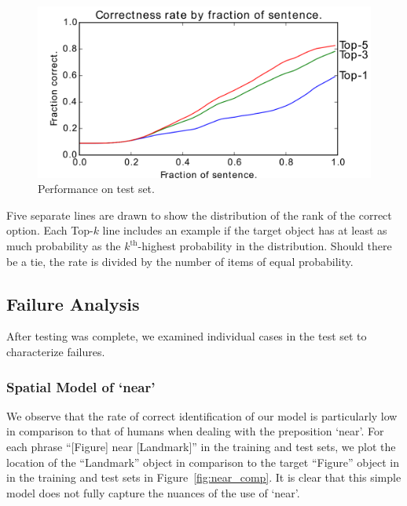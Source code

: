 \documentclass[letterpaper,10pt]{article}
\begin{document}
\begin{figure}[H]
  \centering
  \includegraphics[scale=.60]{eval/cdf_by_fraction}
  \caption{Performance on test set.}
  \label{fig:results_inc}
\end{figure}

Five separate lines are drawn to show the distribution of the rank of the correct option. Each Top-$k$ line includes an example if the target object has at least as much probability as the $k^\text{th}$-highest probability in the distribution. Should there be a tie, the rate is divided by the number of items of equal probability.

\subsection{Failure Analysis}
After testing was complete, we examined individual cases in the test set to characterize failures. 

\subsubsection{Spatial Model of `near'}

We observe that the rate of correct identification of our model is particularly low in comparison to that of humans when dealing with the preposition `near'. For each phrase ``[Figure] near [Landmark]'' in the training and test sets, we plot the location of the ``Landmark'' object in comparison to the target ``Figure'' object in in the training and test sets in Figure~\ref{fig:near_comp}. It is clear that this simple model does not fully capture the nuances of the use of `near'.
\end{document}
